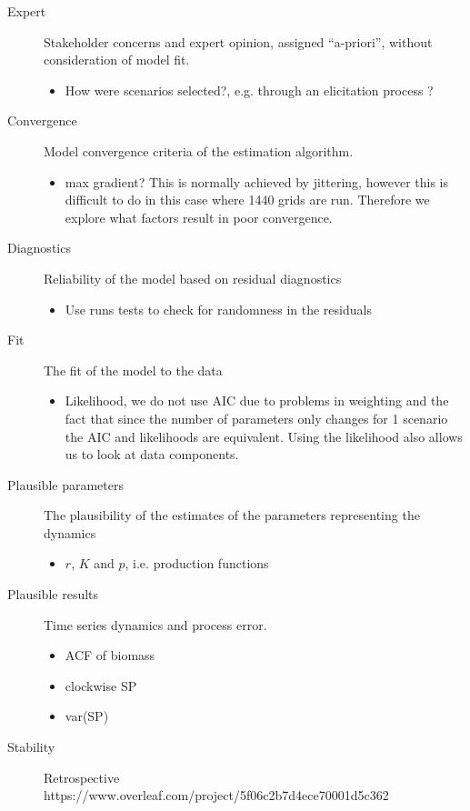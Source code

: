 \begin{description}
\item[Expert] Stakeholder concerns and expert opinion, assigned “a-priori”, without consideration of model fit.
 \begin{itemize}
    \item How were scenarios selected?, e.g. through an elicitation process \citep{leach2014identification}?
\end{itemize}
\item[Convergence] Model convergence criteria of the estimation algorithm. 
\begin{itemize}
    \item max gradient? This is normally achieved by jittering, however this is difficult to do in this case where 1440 grids are run. Therefore we explore what factors result in poor convergence.
\end{itemize}
\item[Diagnostics] Reliability of the model based on residual diagnostics
 \begin{itemize}
    \item Use runs tests to check for randomness in the residuals 
\end{itemize}
 \item[Fit] The fit of the model to the data
 \begin{itemize}
    \item Likelihood, we do not use AIC due to problems in weighting and the fact that since the number of parameters only changes for 1 scenario the AIC and likelihoods are equivalent. Using the likelihood also allows us to look at data components.
\end{itemize}
\item[Plausible parameters] The plausibility of the estimates of the parameters representing the dynamics
 \begin{itemize}
    \item  $r$, $K$ and $p$, i.e. production functions
\end{itemize}
\item[Plausible results] Time series dynamics and process error.
\begin{itemize}
    \item ACF of biomass
    \item clockwise SP
    \item var(SP)
\end{itemize}
\item[Stability] Retrospective
https://www.overleaf.com/project/5f06c2b7d4ece70001d5c362\begin{itemize}

\end{itemize}
\end{description}
